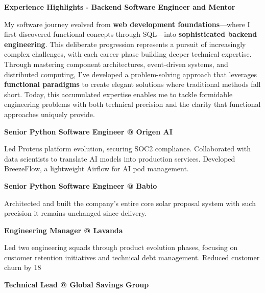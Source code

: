 \documentclass[a4paper,10pt]{article}
\begin{document}
\vspace{0.7cm}
\noindent
\begin{minipage}{\textwidth}
	{\large\bfseries\color{darkblue}\selectfont Experience Highlights}
	{\small\bfseries\color{darkblue}\selectfont - Backend Software Engineer and Mentor}
	\vspace{0.5cm}

	My software journey evolved from \textbf{web development foundations}—where I first discovered functional concepts through SQL—into \textbf{sophisticated backend engineering}. This deliberate progression represents a pursuit of increasingly complex challenges, with each career phase building deeper technical expertise. Through mastering component architectures, event-driven systems, and distributed computing, I've developed a problem-solving approach that leverages \textbf{functional paradigms} to create elegant solutions where traditional methods fall short. Today, this accumulated expertise enables me to tackle formidable engineering problems with both technical precision and the clarity that functional approaches uniquely provide.

	\vspace{0.7cm}
	\begin{minipage}{0.48\textwidth}
		\noindent\textbf{Senior Python Software Engineer @ Origen AI}

Led Proteus platform evolution, securing SOC2 compliance. Collaborated with data
        scientists to translate AI models into production services. Developed
        BreezeFlow, a lightweight Airflow for AI pod management.

		\vspace{0.3cm}
		\noindent\textbf{Senior Python Software Engineer @ Babio}

		Architected and built the company's entire core solar proposal system with such precision it remains unchanged since delivery.

		\vspace{0.3cm}
		\noindent\textbf{Engineering Manager @ Lavanda}

		Led two engineering squads through product evolution phases, focusing on customer retention initiatives and technical debt management. Reduced customer churn by 18%
	\end{minipage}
	\hfill
	\begin{minipage}{0.48\textwidth}
		\noindent\textbf{Technical Lead @ Global Savings Group}


\end{minipage}
\end{minipage}
\end{document}
